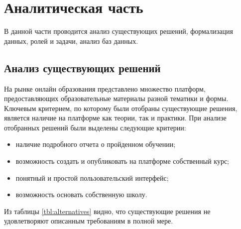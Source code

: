 \chapter{Аналитическая часть}

В данной части проводится анализ существующих решений, формализация данных, ролей и задачи, анализ баз данных.

\section{Анализ существующих решений}
На рынке онлайн образования представлено множество платформ, предоставляющих образовательные материалы разной тематики и формы. Ключевым критерием, по которому были отобраны существующие решения, является наличие на платформе как теории, так и практики. При анализе отобранных решений были выделены следующие критерии:
\begin{itemize}
    \item наличие подробного отчета о пройденном обучении;
    \item возможность создать и опубликовать на платформе собственный курс;
    \item понятный и простой пользовательский интерфейс;
    \item возможность основать собственную школу.
\end{itemize}

\begin{table}[H]
    \caption{\label{tbl:alternatives}Сравнение существующих решений}
\end{table}

Из таблицы \ref{tbl:alternatives} видно, что существующие решения не удовлетворяют описанным требованиям в полной мере.

